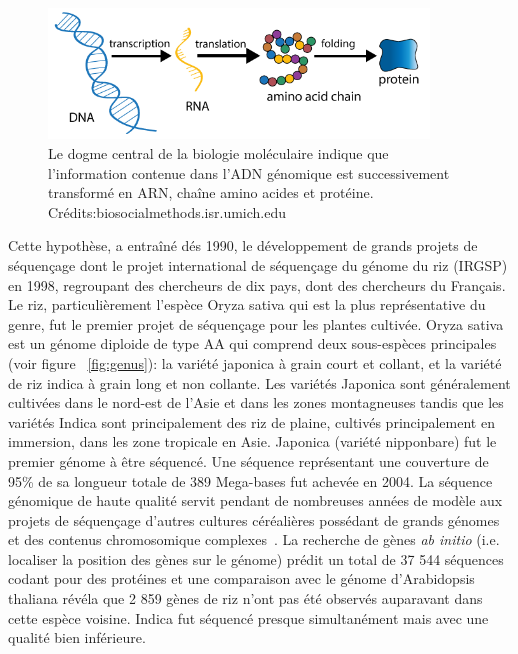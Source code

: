 \begin{figure}[!ht]
    \centering
    \includegraphics[width=0.90\textwidth]{hdr_manuscript/Figures/central-dogma.png}
    \caption{Le dogme central de la biologie moléculaire indique que l'information contenue dans l'ADN génomique est successivement transformé en ARN, chaîne amino acides et protéine. Crédits:biosocialmethods.isr.umich.edu}
    \label{fig:dogma}
\end{figure}



Cette hypothèse, a entraîné dés 1990, le développement de grands projets de séquençage dont le projet international de séquençage du génome du riz (IRGSP) en 1998, regroupant des chercheurs de dix pays, dont des chercheurs du Français. Le riz, particulièrement l'espèce Oryza sativa qui est la plus représentative du genre, fut le premier projet de séquençage pour les plantes cultivée. Oryza sativa est un génome diploide de type AA qui comprend deux sous-espèces principales (voir figure ~\ref{fig:genus}): la variété japonica à grain court et collant, et la variété de riz indica à grain long et non collante. Les variétés Japonica sont généralement cultivées dans le nord-est de l'Asie et dans les zones montagneuses tandis que les variétés Indica sont principalement des riz de plaine, cultivés principalement en immersion, dans les zone tropicale en Asie. Japonica (variété nipponbare) fut le premier génome à être séquencé. Une séquence représentant une couverture de 95\% de sa longueur totale de 389 Mega-bases fut achevée en 2004. La séquence génomique de haute qualité servit pendant de nombreuses années de modèle aux projets de séquençage d'autres cultures céréalières possédant de grands génomes et des contenus chromosomique complexes~\cite{matsumoto_nipponbare_2016}. La recherche de gènes  \textit{ab initio} (i.e. localiser la position des gènes sur le génome) prédit un total de 37 544 séquences codant pour des protéines et une comparaison avec le génome d'Arabidopsis thaliana révéla que 2 859 gènes de riz n'ont pas été observés auparavant dans cette espèce voisine. Indica fut séquencé presque simultanément mais avec une qualité bien inférieure.\\

